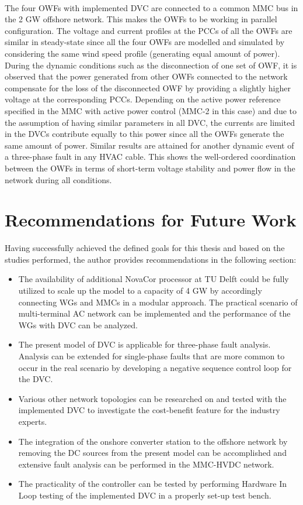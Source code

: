 \paragraph{} The four \gls{OWF}s with implemented \gls{DVC} are connected to a common \gls{MMC} bus in the 2 GW offshore network. This makes the \gls{OWF}s to be working in parallel configuration. The voltage and current profiles at the \gls{PCC}s of all the \gls{OWF}s are similar in steady-state since all the four \gls{OWF}s are modelled and simulated by considering the same wind speed profile (generating equal amount of power). During the dynamic conditions such as the disconnection of one set of \gls{OWF}, it is observed that the power generated from other \gls{OWF}s connected to the network compensate for the loss of the disconnected \gls{OWF} by providing a slightly higher voltage at the corresponding \gls{PCC}s. Depending on the active power reference specified in the \gls{MMC} with active power control (\gls{MMC}-2 in this case) and due to the assumption of having similar parameters in all \gls{DVC}, the currents are limited in the \gls{DVC}s contribute equally to this power since all the \gls{OWF}s generate the same amount of power. Similar results are attained for another dynamic event of a three-phase fault in any \gls{HVAC} cable. This shows the well-ordered coordination between the \gls{OWF}s in terms of short-term voltage stability and power flow in the network during all conditions.  

\section{Recommendations for Future Work}
Having successfully achieved the defined goals for this thesis and based on the studies performed, the author provides recommendations in the following section:  
\begin{itemize}
    \item The availability of additional NovaCor processor at TU Delft could be fully utilized to scale up the model to a capacity of 4 GW by accordingly connecting \gls{WG}s and \gls{MMC}s in a modular approach. The practical scenario of multi-terminal \gls{AC} network can be implemented and the performance of the \gls{WG}s with \gls{DVC} can be analyzed.
    \item The present model of \gls{DVC} is applicable for three-phase fault analysis. Analysis can be extended for single-phase faults that are more common to occur in the real scenario by developing a negative sequence control loop for the \gls{DVC}.
    \item Various other network topologies can be researched on and tested with the implemented \gls{DVC} to investigate the cost-benefit feature for the industry experts. 
    \item The integration of the onshore converter station to the offshore network by removing the \gls{DC} sources from the present model can be accomplished and extensive fault analysis can be performed in the \gls{MMC}-\gls{HVDC} network.
    \item The practicality of the controller can be tested by performing Hardware In Loop testing of the implemented \gls{DVC} in a properly set-up test bench.
\end{itemize}